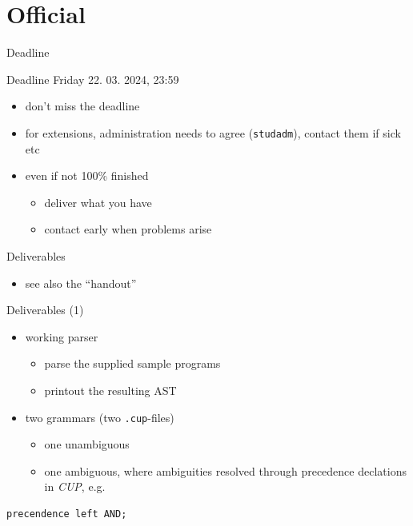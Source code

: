 \documentclass{beamer}
\begin{document}
\section{Official}
\label{sec:orgba6323a}

\begin{frame}[label={sec:org5501907},fragile]{Deadline}
 \begin{alertblock}{Deadline}
\alert{Friday 22. 03. 2024, 23:59}
\end{alertblock}
\begin{itemize}
\item don't miss the deadline
\item for extensions, administration needs to agree (\texttt{studadm}), contact them
if sick etc
\item even if not 100\% finished
\begin{itemize}
\item deliver what you have
\item contact early when problems arise
\end{itemize}
\end{itemize}
\end{frame}
\begin{frame}[label={sec:org4bbd1f0},fragile]{Deliverables}
 \begin{itemize}
\item see also the ``handout''
\end{itemize}
\begin{block}{Deliverables (1)}
\begin{itemize}
\item working \alert{parser}
\begin{itemize}
\item parse the supplied sample programs
\item printout the resulting AST
\end{itemize}

\item \alert{two} grammars (two \texttt{.cup}-files)

\begin{itemize}
\item one unambiguous
\item one ambiguous, where ambiguities resolved through precedence
declations in \emph{CUP}, e.g.
\end{itemize}
\end{itemize}

\begin{verbatim}
precendence left AND;
\end{verbatim}
\end{block}
\end{frame}
\end{document}
